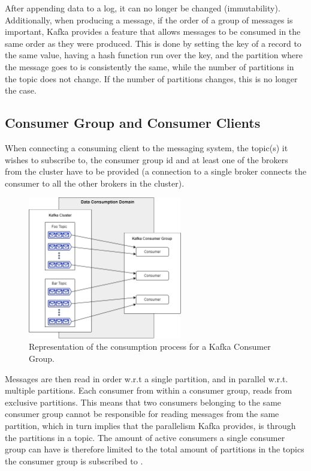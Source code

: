 After appending data to a log, it can no longer be changed (immutability).
Additionally, when producing a message, if the order of a group of messages is
important, Kafka provides a feature that allows messages to be consumed in the
same order as they were produced. This is done by setting the key of a record to
the same value, having a hash function run over the key, and the partition where
the message goes to is consistently the same, while the number of partitions in
the topic does not change. If the number of partitions changes, this is no
longer the case.

\subsection{Consumer Group and Consumer Clients}
\label{sec:kafka_consumer_group}

When connecting a consuming client to the messaging system, the topic(s) it
wishes to subscribe to, the consumer group id and at least one of the brokers from
the cluster have to be provided (a connection to a single broker connects the
consumer to all the other brokers in the cluster). 

\begin{figure}[hbt!] 
    \centering
    \includegraphics[width=0.6\textwidth]{images/infrastructure/Consumption Domain.png}
    \caption{
        Representation of the consumption process for a Kafka Consumer Group.
    } 
    \label{fig:data_consumption_domain} 
\end{figure}

Messages are then read in order w.r.t a single partition, and in parallel w.r.t.
multiple partitions. Each consumer from within a consumer group, reads from
exclusive partitions.  This means that two consumers belonging to the same
consumer group cannot be responsible for reading messages from the same
partition, which in turn implies that the parallelism Kafka provides, is through
the partitions in a topic. The amount of active consumers a single consumer
group can have is therefore limited to the total amount of partitions in the
topics the consumer group is subscribed to \cite{OreillyConsumer}. 

